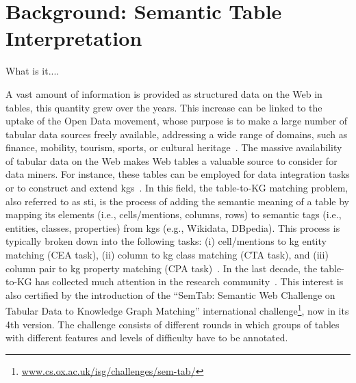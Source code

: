 \section{Background: Semantic Table Interpretation}
What is it....

A vast amount of information is provided as structured data on the Web in tables, this quantity grew over the years. This increase can be linked to the uptake of the Open Data movement, whose purpose is to make a large number of tabular data sources freely available, addressing a wide range of domains, such as finance, mobility, tourism, sports, or cultural heritage~\cite{Neumaier2016}. The massive availability of tabular data on the Web makes Web tables a valuable source to consider for data miners. For instance, these tables can be employed for data integration tasks or to construct and extend \acp{kg}~\cite{Kejriwal2021}. In this field, the table-to-KG matching problem, also referred to as \ac{sti}, is the process of adding the semantic meaning of a table by mapping its elements (i.e., cells/mentions, columns, rows) to semantic tags (i.e., entities, classes, properties) from \acp{kg} (e.g., Wikidata, DBpedia). This process is typically broken down into the following tasks: (i) cell/mentions to \ac{kg} entity matching (CEA task), (ii) column to \ac{kg} class matching (CTA task), and (iii) column pair to \ac{kg} property matching (CPA task)~\cite{Cutrona2021-1}. In the last decade, the table-to-KG has collected much attention in the research community~\cite{Cutrona2021-1}. This interest is also certified by the introduction of the ``SemTab: Semantic Web Challenge on Tabular Data to Knowledge Graph Matching'' international challenge\footnote{\href{https://www.cs.ox.ac.uk/isg/challenges/sem-tab/}{www.cs.ox.ac.uk/isg/challenges/sem-tab/}}, now in its 4th version. The challenge consists of different rounds in which groups of tables with different features and levels of difficulty have to be annotated.